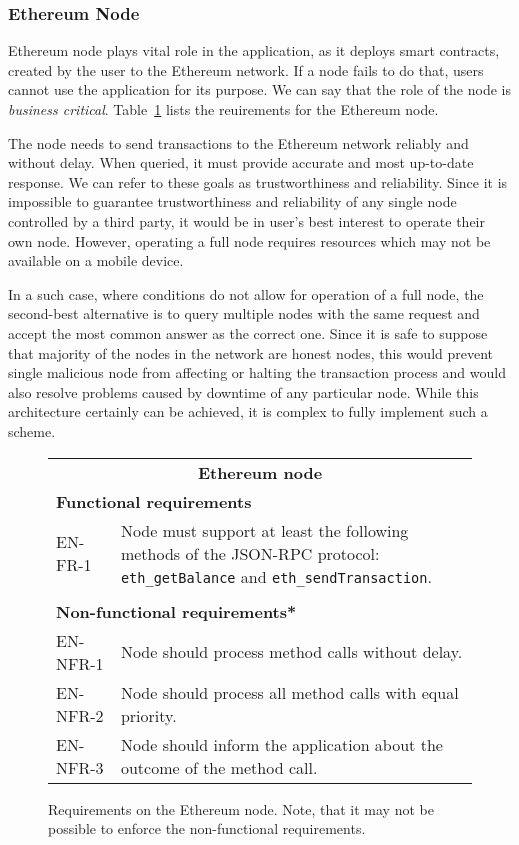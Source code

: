 \subsubsection{Ethereum Node}
Ethereum node plays vital role in the application, as it deploys smart contracts, created by the user to the Ethereum network. If a node fails to do that, users cannot use the application for its purpose. We can say that the role of the node is \textit{business critical}. Table~\ref{fig:reqs-node} lists the reuirements for the Ethereum node.

The node needs to send transactions to the Ethereum network reliably and without delay. When queried, it must provide accurate and most up-to-date response. We can refer to these goals as trustworthiness and reliability. Since it is impossible to guarantee trustworthiness and reliability of any single node controlled by a third party, it would be in user’s best interest to operate their own node. However, operating a full node requires resources which may not be available on a mobile device.

In a such case, where conditions do not allow for operation of a full node, the second-best alternative is to query multiple nodes with the same request and accept the most common answer as the correct one. Since it is safe to suppose that majority of the nodes in the network are honest nodes, this would prevent single malicious node from affecting or halting the transaction process and would also resolve problems caused by downtime of any particular node. While this architecture certainly can be achieved, it is complex to fully implement such a scheme. 

\begin{figure}[ht]
    \centering
    \begin{tabularx}{\textwidth}{|l X|}
        \hline
        \multicolumn{2}{|c|}{\textbf{Ethereum node}}\\
        \multicolumn{2}{|l|}{\textbf{Functional requirements}}\\
        EN-FR-1&Node must support at least the following methods of the JSON-RPC protocol: \texttt{eth\_getBalance} and \texttt{eth\_sendTransaction}.\\
        &\\
        \multicolumn{2}{|l|}{\textbf{Non-functional requirements*}}\\
        EN-NFR-1&Node should process method calls without delay.\\
        EN-NFR-2&Node should process all method calls with equal priority.\\
        EN-NFR-3&Node should inform the application about the outcome of the method call.\\
        \hline
    \end{tabularx}
    \caption{Requirements on the Ethereum node. Note, that it may not be possible to enforce the non-functional requirements.}
    \label{fig:reqs-node}
\end{figure}


